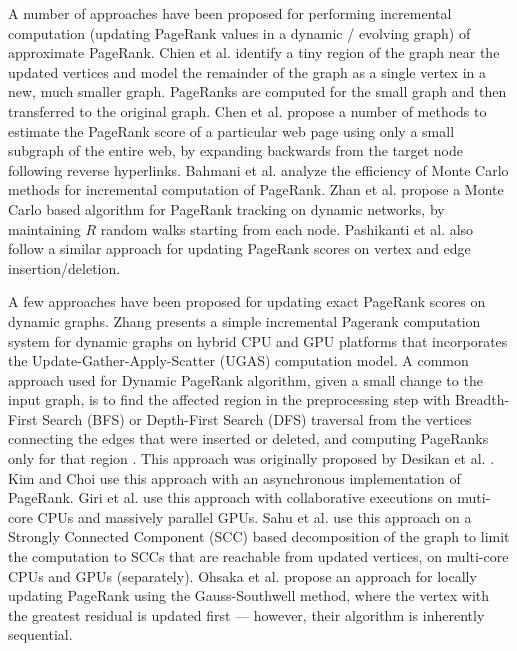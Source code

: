 
A number of approaches have been proposed for performing incremental computation (updating PageRank values in a dynamic / evolving graph) of approximate PageRank. Chien et al. \cite{rank-chien01} identify a tiny region of the graph near the updated vertices and model the remainder of the graph as a single vertex in a new, much smaller graph. PageRanks are computed for the small graph and then transferred to the original graph. Chen et al. \cite{chen2004local} propose a number of methods to estimate the PageRank score of a particular web page using only a small subgraph of the entire web, by expanding backwards from the target node following reverse hyperlinks. Bahmani et al. \cite{bahmani2010fast} analyze the efficiency of Monte Carlo methods for incremental computation of PageRank. Zhan et al. \cite{zhan2019fast} propose a Monte Carlo based algorithm for PageRank tracking on dynamic networks, by maintaining $R$ random walks starting from each node. Pashikanti et al. \cite{rank-pashikanti22} also follow a similar approach for updating PageRank scores on vertex and edge insertion/deletion.

A few approaches have been proposed for updating exact PageRank scores on dynamic graphs. Zhang \cite{rank-zhang17} presents a simple incremental Pagerank computation system for dynamic graphs on hybrid CPU and GPU platforms that incorporates the Update-Gather-Apply-Scatter (UGAS) computation model. A common approach used for Dynamic PageRank algorithm, given a small change to the input graph, is to find the affected region in the preprocessing step with Breadth-First Search (BFS) or Depth-First Search (DFS) traversal from the vertices connecting the edges that were inserted or deleted, and computing PageRanks only for that region \cite{rank-desikan05, kim2015incremental, rank-giri20, sahu2022dynamic}. This approach was originally proposed by Desikan et al. \cite{rank-desikan05}. Kim and Choi \cite{kim2015incremental} use this approach with an asynchronous implementation of PageRank. Giri et al. \cite{rank-giri20} use this approach with collaborative executions on muti-core CPUs and massively parallel GPUs. Sahu et al. \cite{sahu2022dynamic} use this approach on a Strongly Connected Component (SCC) based decomposition of the graph to limit the computation to SCCs that are reachable from updated vertices, on multi-core CPUs and GPUs (separately). Ohsaka et al. \cite{ohsaka2015efficient} propose an approach for locally updating PageRank using the Gauss-Southwell method, where the vertex with the greatest residual is updated first --- however, their algorithm is inherently sequential. 

